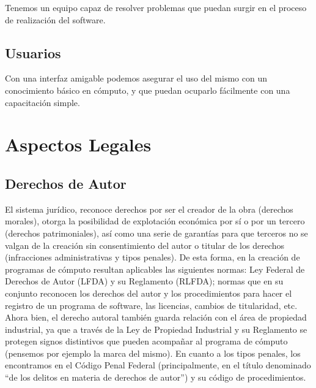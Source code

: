 \documentclass[12pt, fleqn]{report}                             %
\theoremstyle{break}                                            %
\begin{document}
    Tenemos un equipo capaz de resolver problemas que puedan surgir en el proceso de realización del software.
    
    \subsection{Usuarios}
    Con una interfaz amigable podemos asegurar el uso del mismo con un conocimiento básico en cómputo, y que puedan ocuparlo fácilmente con una capacitación simple.
    
    
    \clearpage
    
    
\section{Aspectos Legales}

    \subsection{Derechos de Autor}
    El sistema jurídico, reconoce derechos por ser el creador de la obra (derechos morales), otorga la posibilidad de explotación económica por sí o por un tercero (derechos patrimoniales), así como una serie de garantías para que terceros no se valgan de la creación sin consentimiento del autor o titular de los derechos (infracciones administrativas y tipos penales).  De esta forma, en la creación de programas de cómputo resultan aplicables las siguientes normas:  Ley Federal de Derechos de Autor (LFDA) y su Reglamento (RLFDA); normas que en su conjunto reconocen los derechos del autor y los procedimientos para hacer el registro de un programa de software, las licencias, cambios de titularidad, etc.  Ahora bien, el derecho autoral también guarda relación con el área de propiedad industrial, ya que a través de la Ley de Propiedad Industrial y su Reglamento se protegen signos distintivos que pueden acompañar al programa de cómputo (pensemos por ejemplo la marca del mismo).  En cuanto a los tipos penales, los encontramos en el Código Penal Federal (principalmente, en el título denominado “de los delitos en materia de derechos de autor”) y su código de procedimientos.
\end{document}
